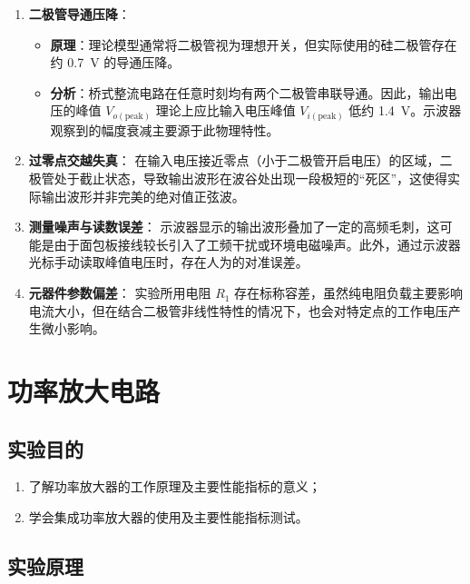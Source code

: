 \documentclass[UTF8, a4paper]{ctexrep} %
\begin{document}
\begin{enumerate}
    \item \textbf{二极管导通压降}：
    \begin{itemize}
        \item \textbf{原理}：理论模型通常将二极管视为理想开关，但实际使用的硅二极管存在约 \qty{0.7}{V} 的导通压降。
        \item \textbf{分析}：桥式整流电路在任意时刻均有两个二极管串联导通。因此，输出电压的峰值 $V_{o(\text{peak})}$ 理论上应比输入电压峰值 $V_{i(\text{peak})}$ 低约 \qty{1.4}{V}。示波器观察到的幅度衰减主要源于此物理特性。
    \end{itemize}
    
    \item \textbf{过零点交越失真}：
    在输入电压接近零点（小于二极管开启电压）的区域，二极管处于截止状态，导致输出波形在波谷处出现一段极短的“死区”，这使得实际输出波形并非完美的绝对值正弦波。
    
    \item \textbf{测量噪声与读数误差}：
    示波器显示的输出波形叠加了一定的高频毛刺，这可能是由于面包板接线较长引入了工频干扰或环境电磁噪声。此外，通过示波器光标手动读取峰值电压时，存在人为的对准误差。
    
    \item \textbf{元器件参数偏差}：
    实验所用电阻 $R_1$ 存在标称容差，虽然纯电阻负载主要影响电流大小，但在结合二极管非线性特性的情况下，也会对特定点的工作电压产生微小影响。
\end{enumerate}



\chapter{功率放大电路} \label{sec:exp8_title_7}
\section{实验目的} \label{subsec:purpose_7}
\begin{enumerate}
    \item 了解功率放大器的工作原理及主要性能指标的意义；
    \item 学会集成功率放大器的使用及主要性能指标测试。
\end{enumerate}

\section{实验原理}
\end{document}
